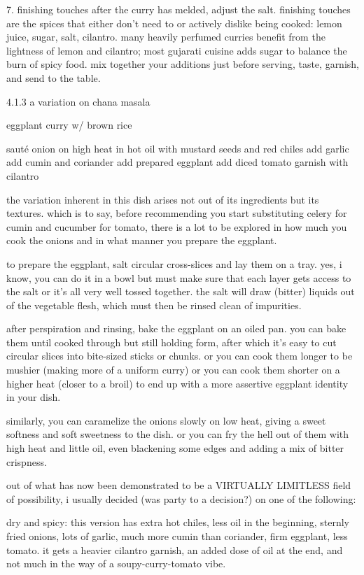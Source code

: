 7. finishing touches
	after the curry has melded, adjust the salt. finishing touches are the spices that either don't need to or actively dislike being cooked: lemon juice, sugar, salt, cilantro. many heavily perfumed curries benefit from the lightness of lemon and cilantro; most gujarati cuisine adds sugar to balance the burn of spicy food. mix together your additions just before serving, taste, garnish, and send to the table.


4.1.3  a variation on chana masala

eggplant curry w/ brown rice

saut\'{e} onion on high heat in hot oil with mustard seeds and red chiles
add garlic
add cumin and coriander
add prepared eggplant
add diced tomato
garnish with cilantro

the variation inherent in this dish arises not out of its ingredients but its textures. which is to say, before recommending you start substituting celery for cumin and cucumber for tomato, there is a lot to be explored in how much you cook the onions and in what manner you prepare the eggplant. 

to prepare the eggplant, salt circular cross-slices and lay them on a tray. yes, i know, you can do it in a bowl but must make sure that each layer gets access to the salt or it's all very well tossed together. the salt will draw (bitter) liquids out of the vegetable flesh, which must then be rinsed clean of impurities. 

after perspiration and rinsing, bake the eggplant on an oiled pan. you can bake them until cooked through but still holding form, after which it's easy to cut circular slices into bite-sized sticks or chunks. or you can cook them longer to be mushier (making more of a uniform curry) or you can cook them shorter on a higher heat (closer to a broil) to end up with a more assertive eggplant identity in your dish. 

similarly, you can caramelize the onions slowly on low heat, giving a sweet softness and soft sweetness to the dish. or you can fry the hell out of them with high heat and little oil, even blackening some edges and adding a mix of bitter crispness. 

out of what has now been demonstrated to be a VIRTUALLY LIMITLESS field of possibility, i usually decided (was party to a decision?) on one of the following:

dry and spicy: this version has extra hot chiles, less oil in the beginning, sternly fried onions, lots of garlic, much more cumin than coriander, firm eggplant, less tomato. it gets a heavier cilantro garnish, an added dose of oil at the end, and not much in the way of a soupy-curry-tomato vibe.

